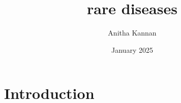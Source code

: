 \documentclass{article}
\title{rare diseases}
\author{Anitha Kannan}
\date{January 2025}
\begin{document}
\maketitle

\section{Introduction}
\end{document}
